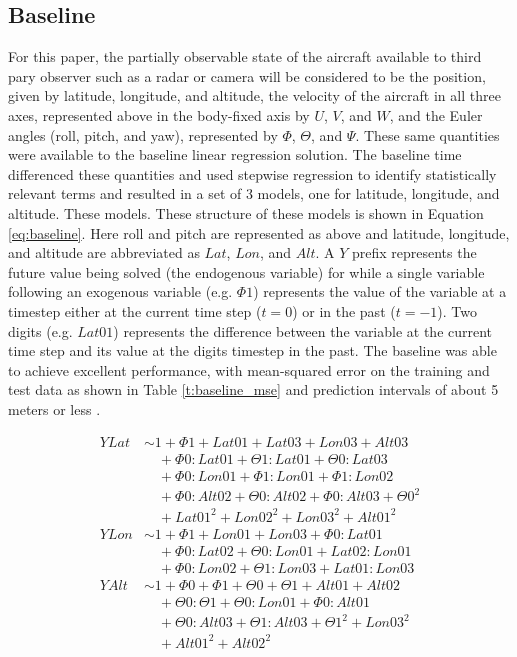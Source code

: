 \documentclass[10pt]{IEEEtran}
\begin{document}
\subsection{Baseline}
For this paper, the partially observable state of the aircraft available to third pary observer such as a radar or camera will be considered to be the position, given by latitude, longitude, and altitude, the velocity of the aircraft in all three axes, represented above in the body-fixed axis by $U$, $V$, and $W$, and the Euler angles (roll, pitch, and yaw), represented by $\Phi$, $\Theta$, and $\Psi$. These same quantities were available to the baseline linear regression solution. The baseline time differenced these quantities and used stepwise regression to identify statistically relevant terms and resulted in a set of 3 models, one for latitude, longitude, and altitude. These models. These structure of these models is shown in Equation \ref{eq:baseline}. Here roll and pitch are represented as above and latitude, longitude, and altitude are abbreviated as $Lat$, $Lon$, and $Alt$. A $Y$ prefix represents the future value being solved (the endogenous variable) for while a single variable following an exogenous variable (e.g. $\Phi1$) represents the value of the variable at a timestep either at the current time step ($t=0$) or in the past ($t=-1$). Two digits (e.g. $Lat01$) represents the difference between the variable at the current time step and its value at the digits timestep in the past. The baseline was able to achieve excellent performance, with mean-squared error on the training and test data as shown in Table \ref{t:baseline_mse} and prediction intervals of about 5 meters or less \cite{baseline}.

\begin{equation}
    \begin{split}
        YLat&\sim 1+\Phi1+Lat01+Lat03+Lon03+Alt03\\
        &\quad+\Phi0:Lat01+\Theta1:Lat01+\Theta0:Lat03\\
        &\quad+\Phi0:Lon01+\Phi1:Lon01+\Phi1:Lon02\\
        &\quad+\Phi0:Alt02+\Theta0:Alt02+\Phi0:Alt03+\Theta0^2\\
        &\quad+Lat01^2+Lon02^2+Lon03^2+Alt01^2\\
        YLon&\sim 1+\Phi1+Lon01+Lon03+\Phi0:Lat01\\
        &\quad+\Phi0:Lat02+\Theta0:Lon01+Lat02:Lon01\\
        &\quad+\Phi0:Lon02+\Theta1:Lon03+Lat01:Lon03\\
        YAlt&\sim 1+\Phi0+\Phi1+\Theta0+\Theta1+Alt01+Alt02\\
        &\quad+\Theta0:\Theta1+\Theta0:Lon01+\Phi0:Alt01\\
        &\quad+\Theta0:Alt03+\Theta1:Alt03+\Theta1^2+Lon03^2\\
        &\quad+Alt01^2+Alt02^2
    \end{split}
    \label{eq:baseline}
\end{equation}
\end{document}
